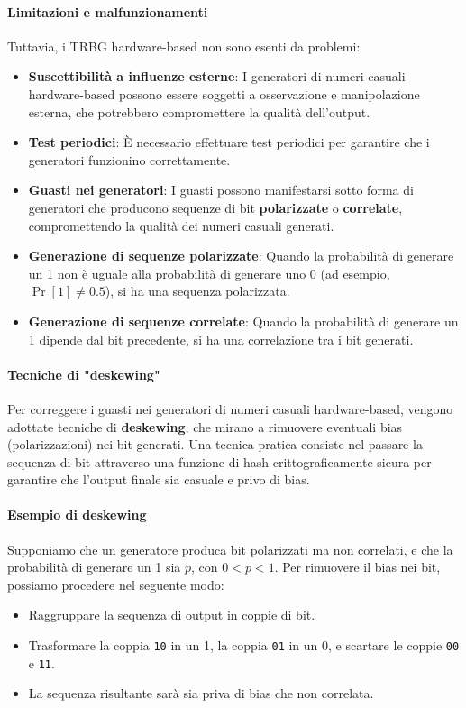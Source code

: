 \documentclass{report}
\begin{document}
\paragraph{Limitazioni e malfunzionamenti}
Tuttavia, i TRBG hardware-based non sono esenti da problemi:
\begin{itemize}
    \item \textbf{Suscettibilità a influenze esterne}: I generatori di numeri casuali hardware-based possono essere soggetti a osservazione e manipolazione esterna, che potrebbero compromettere la qualità dell'output.
    \item \textbf{Test periodici}: È necessario effettuare test periodici per garantire che i generatori funzionino correttamente.
    \item \textbf{Guasti nei generatori}: I guasti possono manifestarsi sotto forma di generatori che producono sequenze di bit \textbf{polarizzate} o \textbf{correlate}, compromettendo la qualità dei numeri casuali generati.
    \item \textbf{Generazione di sequenze polarizzate}: Quando la probabilità di generare un 1 non è uguale alla probabilità di generare uno 0 (ad esempio, \( \Pr[1] \neq 0.5 \)), si ha una sequenza polarizzata.
    \item \textbf{Generazione di sequenze correlate}: Quando la probabilità di generare un 1 dipende dal bit precedente, si ha una correlazione tra i bit generati.
\end{itemize}

\paragraph{Tecniche di "deskewing"}
Per correggere i guasti nei generatori di numeri casuali hardware-based, vengono adottate tecniche di \textbf{deskewing}, che mirano a rimuovere eventuali bias (polarizzazioni) nei bit generati. Una tecnica pratica consiste nel passare la sequenza di bit attraverso una funzione di hash crittograficamente sicura per garantire che l'output finale sia casuale e privo di bias.

\paragraph{Esempio di deskewing}
Supponiamo che un generatore produca bit polarizzati ma non correlati, e che la probabilità di generare un 1 sia \( p \), con \( 0 < p < 1 \). Per rimuovere il bias nei bit, possiamo procedere nel seguente modo:
\begin{itemize}
    \item Raggruppare la sequenza di output in coppie di bit.
    \item Trasformare la coppia \texttt{10} in un 1, la coppia \texttt{01} in un 0, e scartare le coppie \texttt{00} e \texttt{11}.
    \item La sequenza risultante sarà sia priva di bias che non correlata.
\end{itemize}
\end{document}
